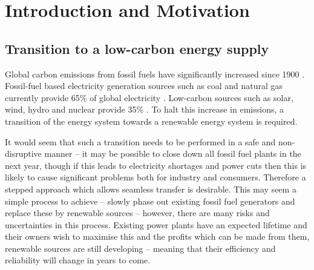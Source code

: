 \section{Introduction and Motivation}
\label{elecsim:sec:intro}

\subsection{Transition to a low-carbon energy supply}

Global carbon emissions from fossil fuels have significantly increased since 1900 \cite{boden2017global}.    Fossil-fuel based electricity generation sources such as coal and natural gas currently provide 65\% of global electricity \cite{BP2018}. Low-carbon sources such as solar, wind, hydro and nuclear provide 35\% . To halt this increase in  emissions, a transition of the energy system towards a renewable energy system is required. 





It would seem that such a transition needs to be performed in a safe and non-disruptive manner -- it may be possible to close down all fossil fuel plants in the next year, though if this leads to electricity shortages and power cuts then this is likely to cause significant problems both for industry and consumers. Therefore a stepped approach which allows seamless transfer is desirable. This may seem a simple process to achieve -- slowly phase out existing fossil fuel generators and replace these by renewable sources -- however, there are many risks and uncertainties in this process. Existing power plants have an expected lifetime and their owners wish to maximise this and the profits which can be made from them, renewable sources are still developing -- meaning that their efficiency and reliability will change in years to come.

